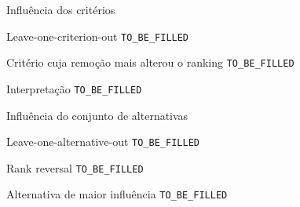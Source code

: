 
\begin{frame}{Influência dos critérios}

    \begin{block}{Leave-one-criterion-out}
        \texttt{TO\_BE\_FILLED}
    \end{block}

    \vspace{0.3cm}

    \begin{block}{Critério cuja remoção mais alterou o ranking}
        \texttt{TO\_BE\_FILLED}
    \end{block}

    \vspace{0.3cm}

    \begin{block}{Interpretação}
        \texttt{TO\_BE\_FILLED}
    \end{block}

\end{frame}



\begin{frame}{Influência do conjunto de alternativas}

    \begin{block}{Leave-one-alternative-out}
        \texttt{TO\_BE\_FILLED}
    \end{block}

    \vspace{0.3cm}

    \begin{block}{Rank reversal}
        \texttt{TO\_BE\_FILLED}
    \end{block}

    \vspace{0.3cm}

    \begin{block}{Alternativa de maior influência}
        \texttt{TO\_BE\_FILLED}
    \end{block}

\end{frame}



